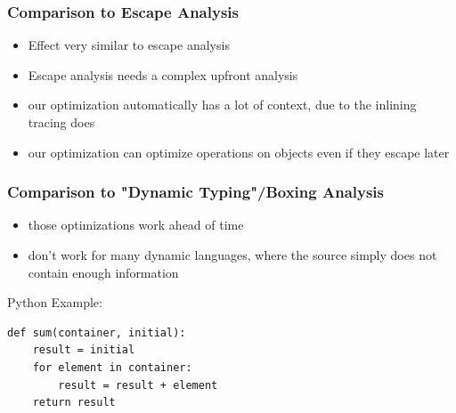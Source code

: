 \documentclass[utf8x]{beamer}
\begin{document}
\begin{frame}
  \frametitle{Comparison to Escape Analysis}
  \begin{itemize}
      \item Effect very similar to escape analysis
      \item Escape analysis needs a complex upfront analysis
      \item our optimization automatically has a lot of context, due to the inlining tracing does
      \item our optimization can optimize operations on objects even if they escape later
  \end{itemize}
\end{frame}

\begin{frame}[containsverbatim]
  \frametitle{Comparison to "Dynamic Typing"/Boxing Analysis}
  \begin{itemize}
      \item those optimizations work ahead of time
      \item don't work for many dynamic languages, where the source simply does not contain enough information
  \end{itemize}
  \pause  
  \begin{block}{Python Example:}
  \begin{verbatim}
def sum(container, initial):
    result = initial
    for element in container:
        result = result + element
    return result
  \end{verbatim}
  \end{block}
\end{frame}
\end{document}
